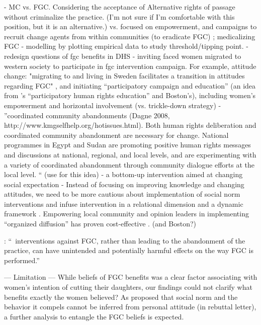 \documentclass[12pt,]{article}
\begin{document}
- MC vs. FGC.  Considering the acceptance of Alternative rights of passage \cite{GaluKama15} without criminalize the practice. (I'm not sure if I'm comfortable with this position, but it is an alternative.) vs. focused on empowerment, and campaigns to recruit change agents from within communities (to eradicate FGC) \cite{ShelHern13, Will18}; medicalizing FGC \cite{LeyeVanE19}
- modelling by plotting empirical data to study threshold/tipping point.
- redesign questions of fgc benefits in DHS
- inviting faced women migrated to western society to participate in fgc intervention campaign.  For example,  attitude change: "migrating to and living in Sweden facilitates a transition in attitudes regarding FGC" \cite{WahlJohn17}, and initiating “participatory campaign and education”  (an idea from ’s “participatory human rights education” and Boston’s), including women’s empowerment and horizontal involvement (vs. trickle-down strategy)
- \cite{MackLeJe08}”coordinated community abandonments (Dagne 2008, http://www.kmgselfhelp.org/hotissues.html). Both human rights deliberation and coordinated community abandonment are necessary for change. National programmes in Egypt and Sudan are promoting positive human rights messages and discussions at national, regional, and local levels, and are experimenting with a variety of coordinated abandonment through community dialogue efforts at the local level. “ (use \cite{Dagn09, MackLeJe08} for this idea)
- a bottom-up intervention aimed at changing social expectation \cite{BiccMari15}
- Instead of focusing on improving knowledge and changing attitudes, we need to be more cautious about implementation of social norm interventions and infuse intervention in a relational dimension and a dynamic framework \cite{CislHeis18a, CislHeis18b, McCh15}.  Empowering local community and opinion leaders in implementing “organized diffusion” \cite{MackLeJe08}has proven cost-effective \cite{CislDenn19}. (and Boston?)

\cite{Cami15}: “ interventions against FGC, rather than leading to the abandonment of the practice, can have unintended and potentially harmful effects on the way FGC is performed.”


— Limitation —
While beliefs of FGC benefits was a clear factor associating with women’s intention of cutting their daughters, our findings could not clarify what benefits exactly the women believed?  As proposed that social norm and the behavior it compels cannot be inferred from personal attitude  (in rebuttal letter), a further analysis to entangle the FGC beliefs is expected.
\end{document}
